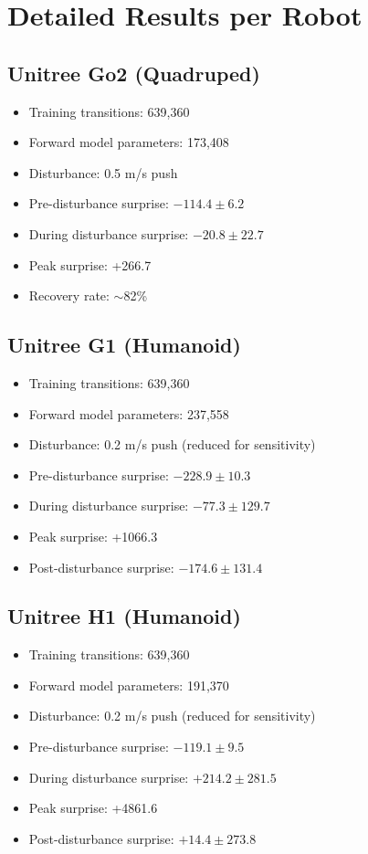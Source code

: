 \documentclass[11pt,a4paper]{article}
\begin{document}
\appendix

\section{Detailed Results per Robot}

\subsection{Unitree Go2 (Quadruped)}
\begin{itemize}
    \item Training transitions: 639,360
    \item Forward model parameters: 173,408
    \item Disturbance: 0.5 m/s push
    \item Pre-disturbance surprise: $-114.4 \pm 6.2$
    \item During disturbance surprise: $-20.8 \pm 22.7$
    \item Peak surprise: +266.7
    \item Recovery rate: $\sim$82\%
\end{itemize}

\subsection{Unitree G1 (Humanoid)}
\begin{itemize}
    \item Training transitions: 639,360
    \item Forward model parameters: 237,558
    \item Disturbance: 0.2 m/s push (reduced for sensitivity)
    \item Pre-disturbance surprise: $-228.9 \pm 10.3$
    \item During disturbance surprise: $-77.3 \pm 129.7$
    \item Peak surprise: +1066.3
    \item Post-disturbance surprise: $-174.6 \pm 131.4$
\end{itemize}

\subsection{Unitree H1 (Humanoid)}
\begin{itemize}
    \item Training transitions: 639,360
    \item Forward model parameters: 191,370
    \item Disturbance: 0.2 m/s push (reduced for sensitivity)
    \item Pre-disturbance surprise: $-119.1 \pm 9.5$
    \item During disturbance surprise: $+214.2 \pm 281.5$
    \item Peak surprise: +4861.6
    \item Post-disturbance surprise: $+14.4 \pm 273.8$
\end{itemize}
\end{document}
